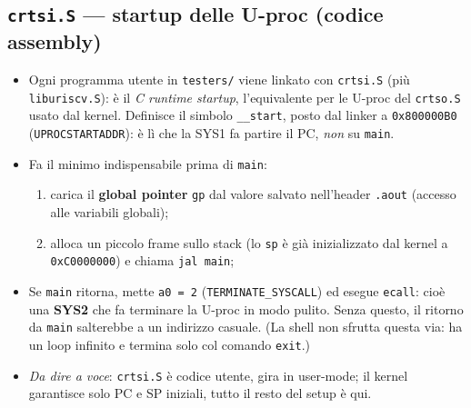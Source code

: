 \documentclass[11pt,a4paper]{article}
\newcommand{\code}[1]{\texttt{#1}}
\begin{document}
\subsection{\code{crtsi.S} --- startup delle U-proc (codice assembly)}
\begin{itemize}
\item Ogni programma utente in \code{testers/} viene linkato con \code{crtsi.S}
  (più \code{liburiscv.S}): è il \emph{C runtime startup}, l'equivalente per le
  U-proc del \code{crtso.S} usato dal kernel. Definisce il simbolo
  \code{\_\_start}, posto dal linker a \code{0x800000B0}
  (\code{UPROCSTARTADDR}): è lì che la SYS1 fa partire il PC, \emph{non} su
  \code{main}.
\item Fa il minimo indispensabile prima di \code{main}:
  \begin{enumerate}
  \item carica il \textbf{global pointer} \code{gp} dal valore salvato
    nell'header \code{.aout} (accesso alle variabili globali);
  \item alloca un piccolo frame sullo stack (lo \code{sp} è già inizializzato
    dal kernel a \code{0xC0000000}) e chiama \code{jal main};
  \end{enumerate}
\item Se \code{main} ritorna, mette \code{a0 = 2} (\code{TERMINATE\_SYSCALL}) ed
  esegue \code{ecall}: cioè una \textbf{SYS2} che fa terminare la U-proc in modo
  pulito. Senza questo, il ritorno da \code{main} salterebbe a un indirizzo
  casuale. (La shell non sfrutta questa via: ha un loop infinito e termina solo
  col comando \code{exit}.)
\item \emph{Da dire a voce}: \code{crtsi.S} è codice utente, gira in user-mode;
  il kernel garantisce solo PC e SP iniziali, tutto il resto del setup è qui.
\end{itemize}
\end{document}
